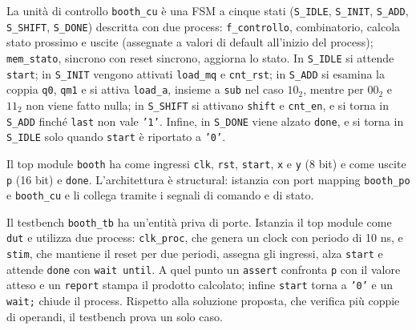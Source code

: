 
La unità di controllo \texttt{booth\_cu} è una FSM a cinque stati (\texttt{S\_IDLE}, \texttt{S\_INIT}, \texttt{S\_ADD}, \texttt{S\_SHIFT}, \texttt{S\_DONE}) descritta con due process: \texttt{f\_controllo}, combinatorio, calcola stato prossimo e uscite (assegnate a valori di default all'inizio del process); \texttt{mem\_stato}, sincrono con reset sincrono, aggiorna lo stato. In \texttt{S\_IDLE} si attende \texttt{start}; in \texttt{S\_INIT} vengono attivati \texttt{load\_mq} e \texttt{cnt\_rst}; in \texttt{S\_ADD} si esamina la coppia \texttt{q0}, \texttt{qm1} e si attiva \texttt{load\_a}, insieme a \texttt{sub} nel caso $10_2$, mentre per $00_2$ e $11_2$ non viene fatto nulla; in \texttt{S\_SHIFT} si attivano \texttt{shift} e \texttt{cnt\_en}, e si torna in \texttt{S\_ADD} finché \texttt{last} non vale \texttt{'1'}. Infine, in \texttt{S\_DONE} viene alzato \texttt{done}, e si torna in \texttt{S\_IDLE} solo quando \texttt{start} è riportato a \texttt{'0'}.


Il top module \texttt{booth} ha come ingressi \texttt{clk}, \texttt{rst}, \texttt{start}, \texttt{x} e \texttt{y} (8 bit) e come uscite \texttt{p} (16 bit) e \texttt{done}. L'architettura è structural: istanzia con port mapping \texttt{booth\_po} e \texttt{booth\_cu} e li collega tramite i segnali di comando e di stato.


\simulazione

Il testbench \texttt{booth\_tb} ha un'entità priva di porte. Istanzia il top module come \texttt{dut} e utilizza due process: \texttt{clk\_proc}, che genera un clock con periodo di 10 ns, e \texttt{stim}, che mantiene il reset per due periodi, assegna gli ingressi, alza \texttt{start} e attende \texttt{done} con \texttt{wait until}. A quel punto un \texttt{assert} confronta \texttt{p} con il valore atteso e un \texttt{report} stampa il prodotto calcolato; infine \texttt{start} torna a \texttt{'0'} e un \texttt{wait;} chiude il process. Rispetto alla soluzione proposta, che verifica più coppie di operandi, il testbench prova un solo caso.

